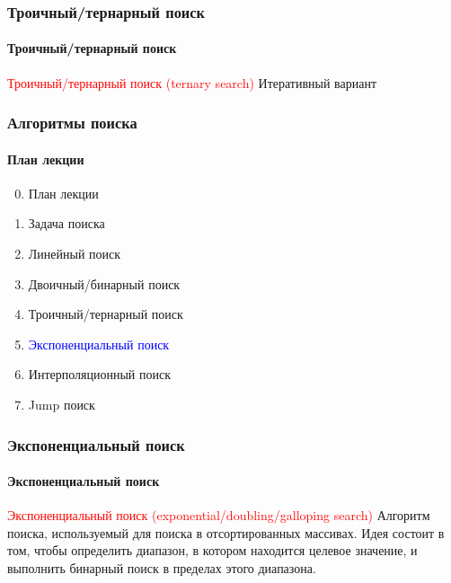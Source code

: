 \documentclass[aspectratio=169]{beamer}
\begin{document}
\begin{frame}
\frametitle{Троичный/тернарный поиск}
\framesubtitle{Троичный/тернарный поиск}
\justifying
\textcolor{red}{Троичный/тернарный поиск (ternary search)}\newline\newline
Итеративный вариант

\begin{figure}
    \captionsetup[subfigure]{labelformat=empty}
    \centering
\end{figure}
\end{frame}

\begin{frame}
\frametitle{Алгоритмы поиска}
\framesubtitle{План лекции}

\begin{enumerate}
  \setcounter{enumi}{-1}
  \item{План лекции}
  \item{Задача поиска}
  \item{Линейный поиск}
  \item{Двоичный/бинарный поиск}
  \item{Троичный/тернарный поиск}
  \item{\textcolor{blue}{Экспоненциальный поиск}}
  \item{Интерполяционный поиск}
  \item{Jump поиск}
\end{enumerate}
\end{frame}


\begin{frame}
\frametitle{Экспоненциальный поиск}
\framesubtitle{Экспоненциальный поиск}
\justifying

\textcolor{red}{Экспоненциальный поиск (exponential/doubling/galloping search)} \newline Алгоритм поиска, используемый для поиска в отсортированных массивах. \newline Идея состоит в том, чтобы определить диапазон, в котором находится целевое значение, и выполнить бинарный поиск в пределах этого диапазона. 

\begin{figure}
    \captionsetup[subfigure]{labelformat=empty}
    \centering
\end{figure}

\end{frame}
\end{document}
